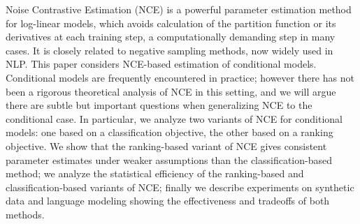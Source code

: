 Noise Contrastive Estimation (NCE) is a powerful parameter estimation method for log-linear models, which avoids calculation of the partition function or its derivatives at each training step, a computationally demanding step in many cases. It is closely related to negative sampling methods, now widely used in NLP. This paper considers NCE-based estimation of conditional models. Conditional models are frequently encountered in practice; however there has not been a rigorous theoretical analysis of NCE in this setting, and we will argue there are subtle but important questions when generalizing NCE to the conditional case. In particular, we analyze two variants of NCE for conditional models: one based on a classification objective, the other based on a ranking objective. We show that the ranking-based variant of NCE gives consistent parameter estimates under weaker assumptions than the classification-based method; we analyze the statistical efficiency of the ranking-based and classification-based variants of NCE; finally we describe experiments on synthetic data and language modeling showing the effectiveness and tradeoffs of both methods.
